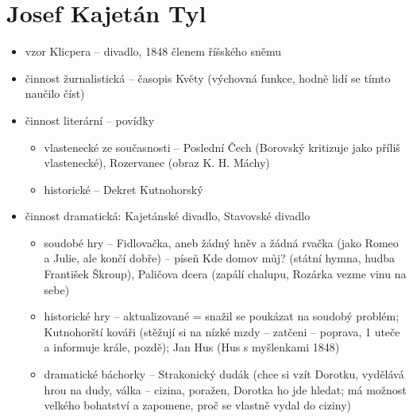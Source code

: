 \documentclass{article}
\begin{document}
\section{Josef Kajetán Tyl}
\begin{itemize}
  \item vzor Klicpera -- divadlo, 1848 členem říšského sněmu
  \item činnost žurnalistická -- časopis Květy (výchovná funkce, hodně lidí se tímto naučilo číst)
  \item činnost literární -- povídky
  \begin{itemize}
    \item vlastenecké ze současnosti -- Poslední Čech (Borovský kritizuje jako příliš vlastenecké), Rozervanec (obraz K. H. Máchy)
    \item historické -- Dekret Kutnohorský
  \end{itemize}
  \item činnost dramatická: Kajetánské divadlo, Stavovské divadlo
  \begin{itemize}
    \item soudobé hry -- Fidlovačka, aneb žádný hněv a žádná rvačka (jako Romeo a Julie, ale končí dobře) -- píseň Kde domov můj? (státní hymna, hudba František Škroup), Paličova dcera (zapálí chalupu, Rozárka vezme vinu na sebe)
    \item historické hry -- aktualizované = snažil se poukázat na soudobý problém; Kutnohorští kováři (stěžují si na nízké mzdy -- zatčeni -- poprava, 1 uteče a informuje krále, pozdě); Jan Hus (Hus s myšlenkami 1848)
    \item dramatické báchorky -- Strakonický dudák (chce si vzít Dorotku, vydělává hrou na dudy, válka -- cizina, poražen, Dorotka ho jde hledat; má možnost velkého bohatství a zapomene, proč se vlastně vydal do ciziny)
  \end{itemize}
\end{itemize}
\end{document}
